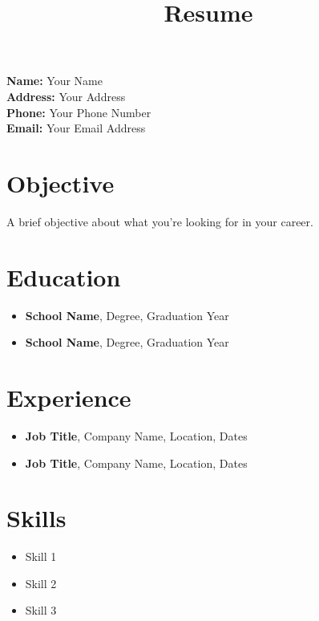 \documentclass[a4paper,10pt]{article}
\title{\vspace{-4cm}\bfseries Resume}
\date{}
\begin{document}
\maketitle

\noindent
\textbf{Name:} Your Name \\
\textbf{Address:} Your Address \\
\textbf{Phone:} Your Phone Number \\
\textbf{Email:} Your Email Address \\

\section*{Objective}
A brief objective about what you're looking for in your career.

\section*{Education}
\begin{itemize}
\item \textbf{School Name}, Degree, Graduation Year
\item \textbf{School Name}, Degree, Graduation Year
\end{itemize}

\section*{Experience}
\begin{itemize}
\item \textbf{Job Title}, Company Name, Location, Dates
\item \textbf{Job Title}, Company Name, Location, Dates
\end{itemize}

\section*{Skills}
\begin{itemize}
\item Skill 1
\item Skill 2
\item Skill 3
\end{itemize}
\end{document}
